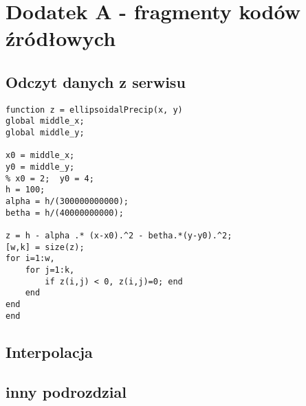 \chapter{Dodatek A - fragmenty kodów źródłowych}
\label{cha:dodatek_A}
\section{Odczyt danych z serwisu}

\begin{lstlisting}
function z = ellipsoidalPrecip(x, y)
global middle_x;
global middle_y;

x0 = middle_x;
y0 = middle_y;
% x0 = 2;  y0 = 4;
h = 100;
alpha = h/(300000000000); 
betha = h/(40000000000);

z = h - alpha .* (x-x0).^2 - betha.*(y-y0).^2;
[w,k] = size(z);
for i=1:w,
    for j=1:k,
        if z(i,j) < 0, z(i,j)=0; end
    end
end
end
\end{lstlisting}


\label{sec:kod_odczyt_danych}
\section{Interpolacja}
\section{inny podrozdzial}